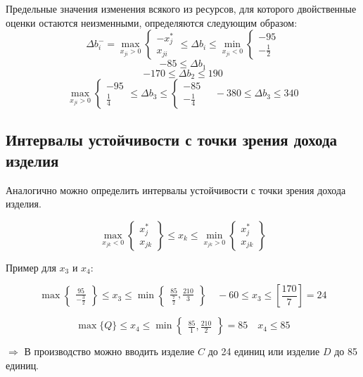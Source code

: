 \documentclass[17pt]{extarticle}
\begin{document}
Предельные значения изменения всякого из ресурсов, для которого двойственные оценки остаются неизменными, определяются следующим образом:
\[
    \Delta b_i^- = \max_{x_{ji} > 0}
    \begin{cases}
        -x_j^* \\
        x_{ji}
    \end{cases}
    \le \Delta b_i \le \min_{x_{ji} < 0}
    \begin{cases}
        -95 \\
        -\frac{1}{2}
    \end{cases}
\]
\[
    -85 \le \Delta b_1
\]
\[
    -170 \le \Delta b_2 \le 190
\]
\[
    \max_{x_{ji} > 0}
    \begin{cases}
        -95 \\
        \frac{1}{4}
    \end{cases}
    \le \Delta b_3 \le
    \begin{cases}
        -85 \\
        -\frac{1}{4}
    \end{cases}
    \quad -380 \le \Delta b_3 \le 340
\]

\subsection{Интервалы устойчивости с точки зрения дохода изделия}
Аналогично можно определить интервалы устойчивости с точки зрения дохода изделия.

\[
    \max_{x_{jk} < 0} \left\{
    \begin{array}{c}
        x_j^* \\
        x_{jk}
    \end{array}
    \right\} \leq x_k \leq \min_{x_{jk} > 0} \left\{
    \begin{array}{c}
        x_j^* \\
        x_{jk}
    \end{array}
    \right\}
\]

Пример для \( x_3 \) и \( x_4 \):

\[
    \max \left\{
    \begin{array}{c}
        \frac{95}{-\frac{3}{2}}
    \end{array}
    \right\} \leq x_3 \leq \min \left\{
    \begin{array}{c}
        \frac{85}{\frac{7}{2}}, \frac{210}{3}
    \end{array}
    \right\} \quad -60 \leq x_3 \leq \left[ \frac{170}{7} \right] = 24
\]

\[
    \max \{Q\} \leq x_4 \leq \min \left\{
    \begin{array}{c}
        \frac{85}{1}, \frac{210}{2}
    \end{array}
    \right\} = 85 \quad x_4 \leq 85
\]

\(\Rightarrow\) В производство можно вводить изделие \( C \) до 24 единиц или изделие \( D \) до 85 единиц.
\end{document}
